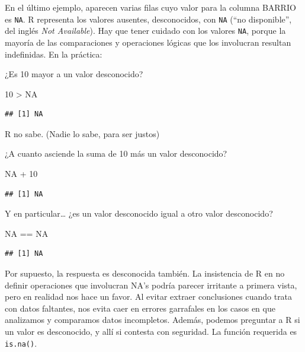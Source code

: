 \documentclass[
]{book}
\newenvironment{Shaded}{\begin{snugshade}}{\end{snugshade}}
\newcommand{\ConstantTok}[1]{\textcolor[rgb]{0.00,0.00,0.00}{#1}}
\newcommand{\DecValTok}[1]{\textcolor[rgb]{0.00,0.00,0.81}{#1}}
\newcommand{\SpecialCharTok}[1]{\textcolor[rgb]{0.00,0.00,0.00}{#1}}
\begin{document}
En el último ejemplo, aparecen varias filas cuyo valor para la columna BARRIO es \texttt{NA}. R representa los valores ausentes, desconocidos, con \texttt{NA} (``no disponible'', del inglés \emph{Not Available}). Hay que tener cuidado con los valores \texttt{NA}, porque la mayoría de las comparaciones y operaciones lógicas que los involucran resultan indefinidas. En la práctica:

¿Es 10 mayor a un valor desconocido?

\begin{Shaded}
\begin{Highlighting}[]
\DecValTok{10} \SpecialCharTok{\textgreater{}} \ConstantTok{NA}
\end{Highlighting}
\end{Shaded}

\begin{verbatim}
## [1] NA
\end{verbatim}

R no sabe. (Nadie lo sabe, para ser justos)

¿A cuanto asciende la suma de 10 más un valor desconocido?

\begin{Shaded}
\begin{Highlighting}[]
\ConstantTok{NA} \SpecialCharTok{+} \DecValTok{10}
\end{Highlighting}
\end{Shaded}

\begin{verbatim}
## [1] NA
\end{verbatim}

Y en particular\ldots{} ¿es un valor desconocido igual a otro valor desconocido?

\begin{Shaded}
\begin{Highlighting}[]
\ConstantTok{NA} \SpecialCharTok{==} \ConstantTok{NA}
\end{Highlighting}
\end{Shaded}

\begin{verbatim}
## [1] NA
\end{verbatim}

Por supuesto, la respuesta es desconocida también. La insistencia de R en no definir operaciones que involucran NA's podría parecer irritante a primera vista, pero en realidad nos hace un favor. Al evitar extraer conclusiones cuando trata con datos faltantes, nos evita caer en errores garrafales en los casos en que analizamos y comparamos datos incompletos. Además, podemos preguntar a R si un valor es desconocido, y allí si contesta con seguridad. La función requerida es \texttt{is.na()}.
\end{document}

